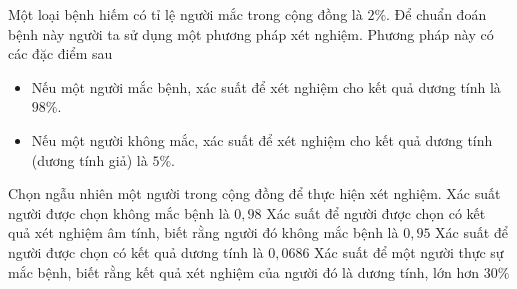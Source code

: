 \begin{ex}%
	Một loại bệnh hiếm có tỉ lệ người mắc trong cộng đồng là $2\%$. Để chuẩn đoán bệnh này người ta sử dụng một phương pháp xét nghiệm. Phương pháp này có các đặc điểm sau
	\begin{itemize}
		\item Nếu một người mắc bệnh, xác suất để xét nghiệm cho kết quả dương tính là $98\%$.
		\item Nếu một người không mắc, xác suất để xét nghiệm cho kết quả dương tính (dương tính giả) là $5\%$.
	\end{itemize}
	Chọn ngẫu nhiên một người trong cộng đồng để thực hiện xét nghiệm.
	\choiceTF
	{\True Xác suất người được chọn không mắc bệnh là $0{,}98$}
	{\True Xác suất để người được chọn có kết quả xét nghiệm âm tính, biết rằng người đó không mắc bệnh là $0{,}95$}
	{\True Xác suất để người được chọn có kết quả dương tính là $0{,}0686$}
	{Xác suất để một người thực sự mắc bệnh, biết rằng kết quả xét nghiệm của người đó là dương tính, lớn hơn $30\%$}
\end{ex}
